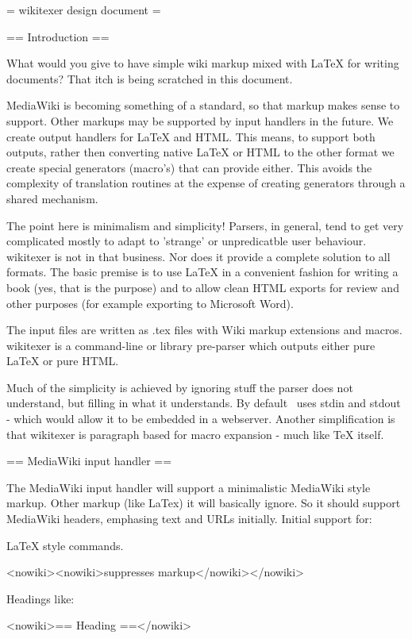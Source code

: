 = wikitexer design document =

== Introduction ==


What would you give to have simple wiki markup mixed with LaTeX for
writing documents? That itch is being scratched in this document. 

MediaWiki is becoming something of a standard, so that markup makes
sense to support. Other markups may be supported by input handlers in
the future. We create output handlers for LaTeX and HTML. This means,
to support both outputs, rather then converting native LaTeX or HTML
to the other format we create special generators (macro's) that can
provide either. This avoids the complexity of translation routines at the
expense of creating generators through a shared mechanism.

The point here is minimalism and simplicity! Parsers, in general, tend
to get very complicated mostly to adapt to 'strange' or unpredicatble
user behaviour. wikitexer is not in that business. Nor does it provide
a complete solution to all formats. The basic premise is to use LaTeX
in a convenient fashion for writing a book (yes, that is the purpose)
and to allow clean HTML exports for review and other purposes (for
example exporting to Microsoft Word).

The input files are written as .tex files with Wiki markup extensions
and macros. wikitexer is a command-line or library pre-parser which
outputs either pure LaTeX or pure HTML.

Much of the simplicity is achieved by ignoring stuff the parser does
not understand, but filling in what it understands. By default
\wikitexer\ uses stdin and stdout - which would allow it to be
embedded in a webserver. Another simplification is that wikitexer is 
paragraph based for macro expansion - much like TeX itself.


== MediaWiki input handler ==

The MediaWiki input handler will support a minimalistic MediaWiki style 
markup. Other markup (like LaTex) it will basically ignore. So it should
support MediaWiki headers, emphasing text and URLs initially. Initial 
support for:

LaTeX style commands.

<nowiki><nowiki>suppresses markup</nowiki></nowiki>

Headings like:

<nowiki>== Heading ==</nowiki>

